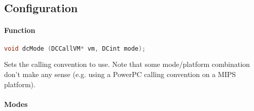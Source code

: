 \pagebreak

\subsection{Configuration}

\paragraph{Function}

\begin{lstlisting}[language=c]
void dcMode (DCCallVM* vm, DCint mode);
\end{lstlisting}

Sets the calling convention to use. Note that some mode/platform combination
don't make any sense (e.g. using a PowerPC calling convention on a MIPS
platform).

\paragraph{Modes}

